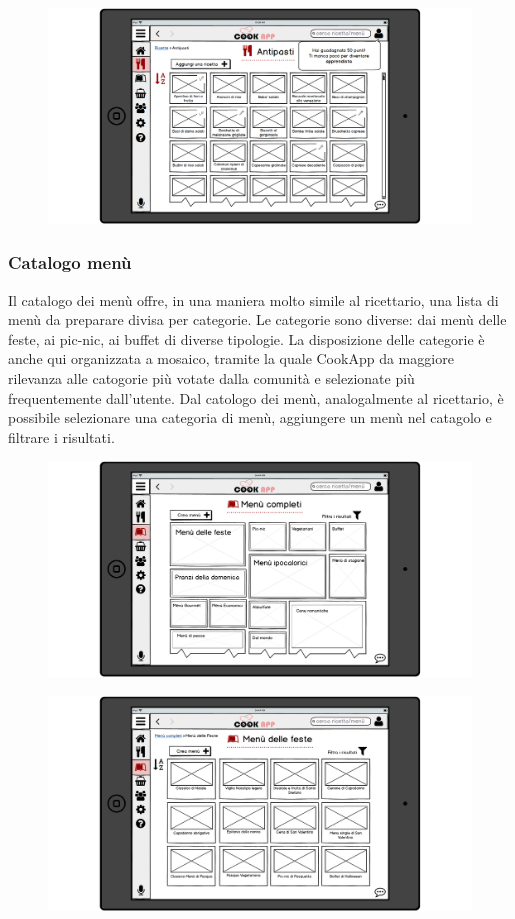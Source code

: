 \begin{figure}[H]
	\centering
	\includegraphics[width=0.95\linewidth]{img/mockup/Aggiungi-ricetta9.png}
\end{figure}


\subsubsection{Catalogo menù}
Il catalogo dei menù offre, in una maniera molto simile al ricettario,
una lista di menù da preparare divisa per categorie. Le categorie sono
diverse: dai menù delle feste, ai pic-nic, ai buffet di diverse
tipologie. La disposizione delle categorie è anche qui organizzata a
mosaico, tramite la quale CookApp da maggiore rilevanza alle catogorie
più votate dalla comunità e selezionate più frequentemente dall'utente.
Dal catologo dei menù, analogalmente al ricettario, è possibile selezionare una categoria di menù,
aggiungere un menù nel catagolo e filtrare i risultati.

\begin{figure}[H]
	\centering
	\includegraphics[width=0.95\linewidth]{img/mockup/menu.png}
\end{figure}
\begin{figure}[H]
	\centering
	\includegraphics[width=0.95\linewidth]{img/mockup/menu-2.png}
\end{figure}

